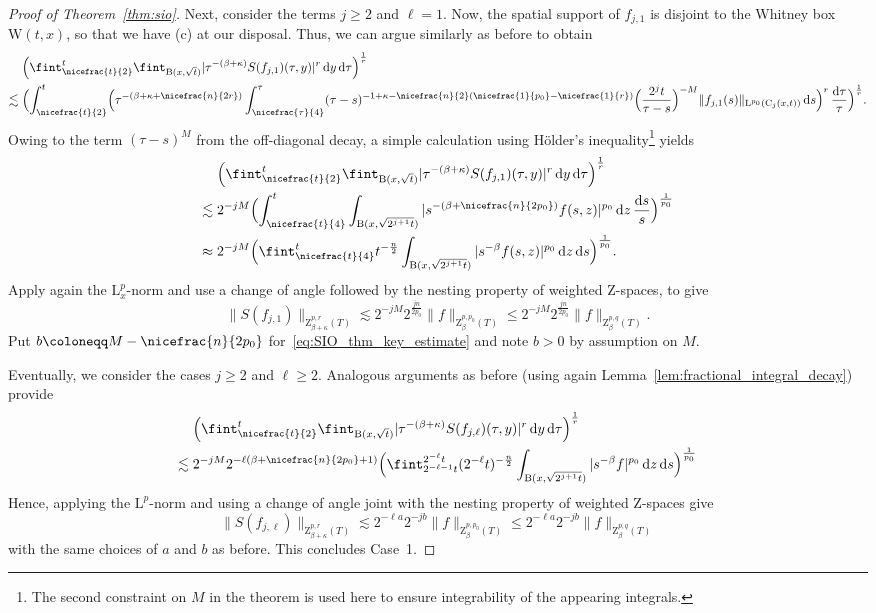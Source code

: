 \documentclass[11pt, leqno]{amsart}
\theoremstyle{definition}
\renewcommand{\L}{\mathrm{L}}
\newcommand{\Z}{\mathrm{Z}}
\newcommand{\ann}{\mathrm{C}}
\newcommand{\WB}{\mathrm{W}}
\renewcommand{\d}{\,\mathrm{d}}
\newcommand{\ddtau}{\,\frac{\mathrm{d}\tau}{\tau}}
\newcommand{\dds}{\,\frac{\mathrm{d}s}{s}}
\newcommand{\B}{\mathrm{B}}
\begin{document}
\begin{proof}[Proof of Theorem~\ref{thm:sio}]
		Next, consider the terms $j \geq 2$ and $\ell = 1$. Now, the spatial support of $f_{j,1}$ is disjoint to the Whitney box $\WB(t,x)$, so that we have (c) at our disposal. Thus, we can argue similarly as before to obtain
		\begin{align}
			&\Bigl( \fint_{\nicefrac{t}{2}}^t \fint_{\B(x,\sqrt{t})} |\tau^{-(\beta + \kappa)} S(f_{j,1})(\tau,y)|^r \d y \d \tau \Bigr)^\frac{1}{r} \\
			\lesssim{} &\Bigl( \int_{\nicefrac{t}{2}}^t \Bigl( \tau^{-(\beta + \kappa + \nicefrac{n}{2r})} \int_{\nicefrac{\tau}{4}}^\tau (\tau-s)^{-1 + \kappa - \nicefrac{n}{2}(\nicefrac{1}{p_0} - \nicefrac{1}{r})} \Bigl(\frac{2^j t}{\tau-s} \Bigr)^{-M} \| f_{j,1}(s) \|_{\L^{p_0}(\ann_j(x,t))} \d s \Bigr)^r \ddtau \Bigr)^\frac{1}{r}.
		\end{align}
		Owing to the term $(\tau-s)^M$ from the off-diagonal decay, a simple calculation using Hölder's inequality\footnote{The second constraint on $M$ in the theorem is used here to ensure integrability of the appearing integrals.} yields
		\begin{align}
			&\Bigl( \fint_{\nicefrac{t}{2}}^t \fint_{\B(x,\sqrt{t})} |\tau^{-(\beta + \kappa)} S(f_{j,1})(\tau,y)|^r \d y \d \tau \Bigr)^\frac{1}{r} \\
			\lesssim{} &2^{-jM} \Bigl( \int_{\nicefrac{t}{4}}^t \int_{\B(x, \sqrt{2^{j+1} t})} |s^{-(\beta + \nicefrac{n}{2p_0})} f(s,z)|^{p_0} \d z \dds \Bigr)^\frac{1}{p_0} \\
			\approx{} &2^{-jM} \Bigl( \fint_{\nicefrac{t}{4}}^t t^{-\frac{n}{2}} \int_{\B(x, \sqrt{2^{j+1} t})} |s^{-\beta} f(s,z)|^{p_0} \d z \d s \Bigr)^\frac{1}{p_0}.
		\end{align}
		Apply again the $\L^p_{x}$-norm and use a change of angle followed by the nesting property of weighted $\Z$-spaces, to give
		$$\| S(f_{j,1}) \|_{\Z^{p,r}_{\beta + \kappa}(T)} \lesssim 2^{-jM} 2^{\frac{jn}{2p_0}} \| f \|_{\Z^{p,p_0}_\beta(T)} \leq 2^{-jM} 2^{\frac{jn}{2p_0}} \| f \|_{\Z^{p,q}_\beta(T)}.$$
		Put $b \coloneqq M - \nicefrac{n}{2p_0}$ for~\eqref{eq:SIO_thm_key_estimate} and note $b > 0$ by assumption on $M$.

		Eventually, we consider the cases $j \geq 2$ and $\ell \geq 2$. Analogous arguments as before (using again Lemma~\ref{lem:fractional_integral_decay}) provide
		\begin{align}
			&\Bigl( \fint_{\nicefrac{t}{2}}^t \fint_{\B(x,\sqrt{t})} |\tau^{-(\beta + \kappa)} S(f_{j,\ell})(\tau,y)|^r \d y \d \tau \Bigr)^\frac{1}{r} \\
			\lesssim{} &2^{-jM} 2^{-\ell(\beta + \nicefrac{n}{2p_0} + 1)} \Bigl( \fint_{2^{-\ell-1} t}^{2^{-\ell}t} (2^{-\ell} t)^{-\frac{n}{2}} \int_{\B(x, \sqrt{2^{j+1} t})} |s^{-\beta} f|^{p_0} \d z \d s \Bigr)^\frac{1}{p_0}
		\end{align}
		Hence, applying the $\L^p$-norm and using a change of angle joint with the nesting property of weighted $\Z$-spaces give
		$$\| S(f_{j,\ell}) \|_{\Z^{p,r}_{\beta + \kappa}(T)} \lesssim 2^{-\ell a} 2^{-jb} \| f \|_{\Z^{p,p_0}_\beta(T)} \leq 2^{-\ell a} 2^{-jb} \| f \|_{\Z^{p,q}_\beta(T)}$$
		with the same choices of $a$ and $b$ as before. This concludes Case~1.


\end{proof}
\end{document}
